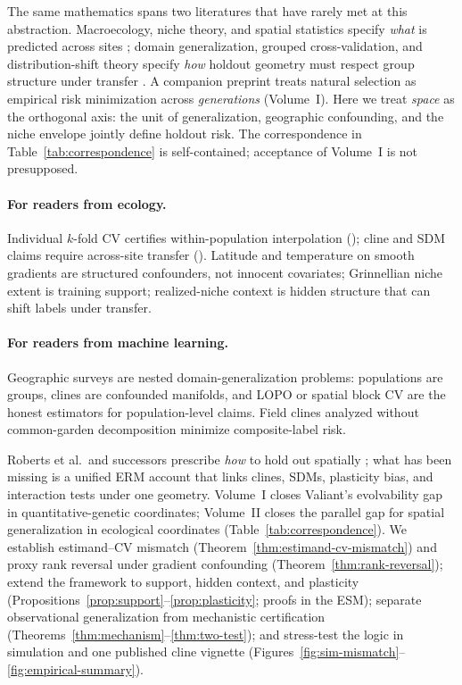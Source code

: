 \documentclass[11pt]{article}
\begin{document}
The same mathematics spans two literatures that have rarely met at this
abstraction.  Macroecology, niche theory, and spatial statistics specify
\emph{what} is predicted across sites
\citep{grinnell1917,hutchinson1957,roberts2017}; domain generalization,
grouped cross-validation, and distribution-shift theory specify \emph{how}
holdout geometry must respect group structure under transfer
\citep{koh2021,quinonero2009,arjovsky2019}.  A companion preprint
\citep{stillwell2026a} treats natural selection as empirical risk
minimization across \emph{generations} (Volume~I).  Here we treat
\emph{space} as the orthogonal axis: the unit of generalization, geographic
confounding, and the niche envelope jointly define holdout risk.  The
correspondence in Table~\ref{tab:correspondence} is self-contained; acceptance
of Volume~I is not presupposed.

\paragraph{For readers from ecology.}
Individual $k$-fold CV certifies within-population interpolation (\Eone);
cline and SDM claims require across-site transfer (\Etwo).  Latitude and
temperature on smooth gradients are structured confounders, not innocent
covariates; Grinnellian niche extent is training support; realized-niche
context is hidden structure that can shift labels under transfer.

\paragraph{For readers from machine learning.}
Geographic surveys are nested domain-generalization problems: populations
are groups, clines are confounded manifolds, and LOPO or spatial block CV
are the honest estimators for population-level claims.  Field clines analyzed
without common-garden decomposition minimize composite-label risk.

Roberts et al.\ and successors prescribe \emph{how} to hold out spatially
\citep{roberts2017,ploton2020}; what has been missing is a unified ERM
account that links clines, SDMs, plasticity bias, and interaction tests under
one geometry.  Volume~I closes Valiant's evolvability gap in
quantitative-genetic coordinates; Volume~II closes the parallel gap for
spatial generalization in ecological coordinates
(Table~\ref{tab:correspondence}).  We establish estimand--CV mismatch
(Theorem~\ref{thm:estimand-cv-mismatch}) and proxy rank reversal under
gradient confounding (Theorem~\ref{thm:rank-reversal}); extend the framework
to support, hidden context, and plasticity (Propositions~\ref{prop:support}--\ref{prop:plasticity}; proofs in the ESM); separate observational
generalization from mechanistic certification
(Theorems~\ref{thm:mechanism}--\ref{thm:two-test}); and stress-test the
logic in simulation and one published cline vignette
(Figures~\ref{fig:sim-mismatch}--\ref{fig:empirical-summary}).
\end{document}
